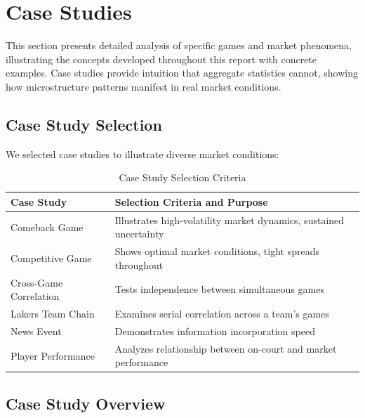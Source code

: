 
\chapter{Case Studies}
\label{sec:case-studies}

This section presents detailed analysis of specific games and market phenomena, illustrating the concepts developed throughout this report with concrete examples. Case studies provide intuition that aggregate statistics cannot, showing how microstructure patterns manifest in real market conditions.

\section{Case Study Selection}

We selected case studies to illustrate diverse market conditions:

\begin{table}[H]
\centering
\caption{Case Study Selection Criteria}
\label{tab:case-selection}
\begin{tabular}{lp{8cm}}
\toprule
\textbf{Case Study} & \textbf{Selection Criteria and Purpose} \\
\midrule
Comeback Game & Illustrates high-volatility market dynamics, sustained uncertainty \\
Competitive Game & Shows optimal market conditions, tight spreads throughout \\
Cross-Game Correlation & Tests independence between simultaneous games \\
Lakers Team Chain & Examines serial correlation across a team's games \\
News Event & Demonstrates information incorporation speed \\
Player Performance & Analyzes relationship between on-court and market performance \\
\bottomrule
\end{tabular}
\end{table}

\section{Case Study Overview}

